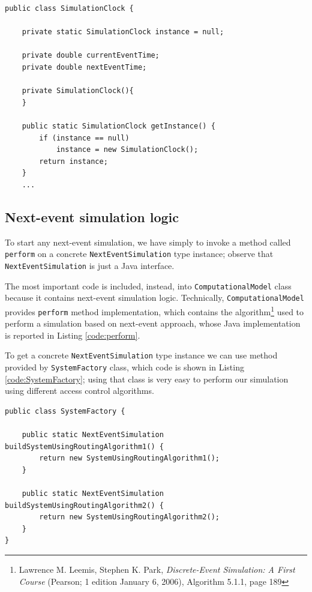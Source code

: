 \documentclass[10pt,a4paper]{article}
\begin{document}
\begin{lstlisting}[frame=lines, caption={\texttt{SimulationClock} class implementation.}, label={code:SimulationClock}]
public class SimulationClock {

    private static SimulationClock instance = null;

    private double currentEventTime;
    private double nextEventTime;

    private SimulationClock(){
    }

    public static SimulationClock getInstance() {
        if (instance == null)
            instance = new SimulationClock();
        return instance;
    } 
    ...
\end{lstlisting}


\subsection{Next-event simulation logic}

To start any next-event simulation, we have simply to invoke a method called \texttt{perform} on a concrete \texttt{NextEventSimulation} type instance; observe that \texttt{NextEventSimulation} is just a Java interface.

The most important code is included, instead, into \texttt{ComputationalModel} class because it contains next-event simulation logic. Technically, \texttt{ComputationalModel} provides \texttt{perform} method implementation, which contains the algorithm\footnote{Lawrence M. Leemis, Stephen K. Park, \textit{Discrete-Event Simulation: A First Course} (Pearson; 1 edition January 6, 2006), Algorithm 5.1.1, page 189} used to perform a simulation based on next-event approach, whose Java implementation is reported in Listing \ref{code:perform}. 

To get a concrete \texttt{NextEventSimulation} type instance we can use method provided by \texttt{SystemFactory} class, which code is shown in Listing \ref{code:SystemFactory}; using that class is very easy to perform our simulation using different access control algorithms.

\begin{lstlisting}[frame=lines, caption={\texttt{SystemFactory} class implementation.}, label={code:SystemFactory}]
public class SystemFactory {

    public static NextEventSimulation buildSystemUsingRoutingAlgorithm1() {
        return new SystemUsingRoutingAlgorithm1();
    }

    public static NextEventSimulation buildSystemUsingRoutingAlgorithm2() {
        return new SystemUsingRoutingAlgorithm2();
    }
}
\end{lstlisting}
\end{document}
